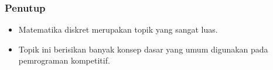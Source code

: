 \begin{frame}
\frametitle{Penutup}
\begin{itemize}
  \item Matematika diskret merupakan topik yang sangat luas.
  \item Topik ini berisikan banyak konsep dasar yang umum digunakan pada pemrograman kompetitif.
\end{itemize}
\end{frame}


